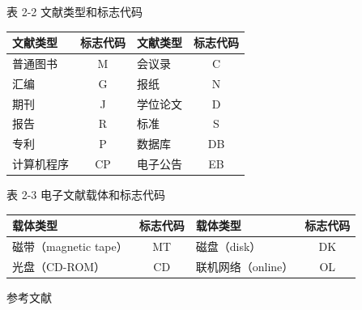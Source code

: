 \documentclass[UTF8, scheme=chinese, openany, oneside]{ctexbook}
\renewcommand{\headrulewidth}{0.4pt}
\renewcommand{\headrule}{%
        \hrule width\headwidth height\headrulewidth\vskip 2pt%
        \hrule width\headwidth height\headrulewidth%
    }
\renewcommand{\headrulewidth}{0.4pt}
\renewcommand{\headrule}{%
        \hrule width\headwidth height\headrulewidth\vskip 2pt%
        \hrule width\headwidth height\headrulewidth%
    }
\renewcommand{\headrulewidth}{0.4pt}
\renewcommand{\headrule}{%
        \hrule width\headwidth height\headrulewidth\vskip 2pt%
        \hrule width\headwidth height\headrulewidth%
    }
\renewcommand{\headrulewidth}{0.4pt}
\renewcommand{\headrulewidth}{0.4pt}
\renewcommand{\headrulewidth}{0.4pt}
\renewcommand{\headrulewidth}{0.6pt}
\renewcommand{\headrulewidth}{0.6pt}
\begin{document}
\vspace{0.5cm}
\begin{center}
 表 2-2 \quad 文献类型和标志代码

\vspace{0.3cm}
\begin{tabular}{p{3cm}cp{3cm}c}
\toprule
文献类型 & {\color{blue}标志代码} & 文献类型 & {\color{blue}标志代码} \\
\midrule
普通图书 & {\color{blue}M} & 会议录 & {\color{blue}C} \\
汇编 & {\color{blue}G} & 报纸 & {\color{blue}N} \\
期刊 & {\color{blue}J} & 学位论文 & {\color{blue}D} \\
报告 & {\color{blue}R} & 标准 & {\color{blue}S} \\
专利 & {\color{blue}P} & 数据库 & {\color{blue}DB} \\
计算机程序 & {\color{blue}CP} & 电子公告 & {\color{blue}EB} \\
\bottomrule
\end{tabular}

\vspace{0.5cm}
表 2-3 \quad 电子文献载体和标志代码

\vspace{0.3cm}
\begin{tabular}{p{4cm}cp{4cm}c}
\toprule
载体类型 & {\color{blue}标志代码} & 载体类型 & {\color{blue}标志代码} \\
\midrule
磁带（magnetic tape） & {\color{blue}MT} & 磁盘（disk） & {\color{blue}DK} \\
光盘（CD-ROM） & {\color{blue}CD} & 联机网络（online） & {\color{blue}OL} \\
\bottomrule
\end{tabular}
\end{center}


\clearpage
\pagestyle{fancy}
\fancyhf{}
\renewcommand{\headrulewidth}{0.4pt}
\renewcommand{\headrule}{%
    \hrule width\headwidth height\headrulewidth\vskip 2pt%
    \hrule width\headwidth height\headrulewidth%
}
\fancyfoot[C]{}

\vspace*{0.3cm}
\begin{center}
    {\sffamily 参考文献}
\end{center}
\vspace{0.3cm}
\end{document}
